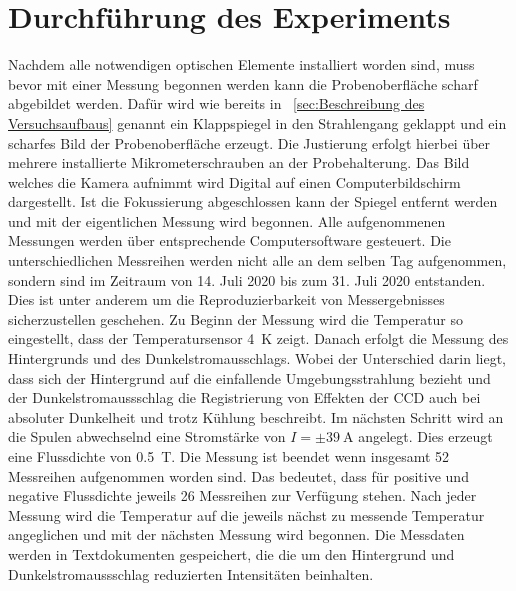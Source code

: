 \section{Durchführung des Experiments}
Nachdem alle notwendigen optischen Elemente installiert worden sind, muss bevor 
mit einer Messung begonnen werden kann die Probenoberfläche scharf abgebildet werden.
Dafür wird wie bereits in ~\ref{sec:Beschreibung des Versuchsaufbaus} genannt ein Klappspiegel in den 
Strahlengang geklappt und ein scharfes Bild der Probenoberfläche erzeugt. 
Die Justierung erfolgt hierbei über mehrere installierte Mikrometerschrauben an der Probehalterung.
Das Bild welches die Kamera aufnimmt wird Digital auf einen Computerbildschirm dargestellt. 
Ist die Fokussierung abgeschlossen kann der Spiegel entfernt werden und mit der eigentlichen Messung 
wird begonnen.
Alle aufgenommenen Messungen werden über entsprechende Computersoftware gesteuert.
Die unterschiedlichen Messreihen werden nicht alle an dem selben Tag aufgenommen, sondern sind
im Zeitraum von 14. Juli 2020 bis zum 31. Juli 2020 entstanden.
Dies ist unter anderem um die Reproduzierbarkeit von Messergebnisses sicherzustellen geschehen.
Zu Beginn der Messung wird die Temperatur so eingestellt, dass der Temperatursensor \SI{4}{\kelvin} zeigt. 
Danach erfolgt die Messung des Hintergrunds und des Dunkelstromausschlags. 
Wobei der Unterschied darin liegt, dass sich der Hintergrund auf die 
einfallende Umgebungsstrahlung bezieht und der Dunkelstromaussschlag die Registrierung von Effekten 
der CCD auch bei absoluter Dunkelheit und trotz Kühlung beschreibt.
Im nächsten Schritt wird an die Spulen abwechselnd eine Stromstärke von 
$I = \pm\SI{39}{\ampere}$ angelegt. Dies erzeugt eine Flussdichte von \SI{0,5}{\tesla}.
Die Messung ist beendet wenn insgesamt 52 Messreihen aufgenommen
worden sind. 
Das bedeutet, dass für positive und negative Flussdichte jeweils 26 Messreihen zur Verfügung stehen.
Nach jeder Messung wird die Temperatur auf die jeweils nächst zu messende Temperatur angeglichen
und mit der nächsten Messung wird begonnen.
Die Messdaten werden in Textdokumenten gespeichert, die die um den Hintergrund und 
Dunkelstromaussschlag reduzierten Intensitäten beinhalten.